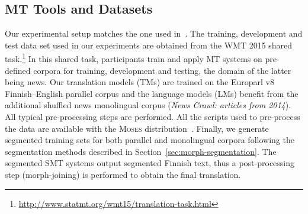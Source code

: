 \documentclass[free]{flammie}
\begin{document}

\subsection{MT Tools and Datasets}

Our experimental setup matches the one used in~\cite{rubino-EtAl:2015:WMT}. 
The training, development and test data set used in our experiments are obtained from the WMT 2015 shared task.\footnote{\url{http://www.statmt.org/wmt15/translation-task.html}}
In this shared task, participants train and apply MT systems on pre-defined corpora for training, development and testing, the domain of the latter being news.
Our translation models (TMs) are trained on the Europarl v8 Finnish--English parallel corpus and the language models (LMs) benefit from the additional shuffled news monolingual corpus (\textit{News Crawl: articles from 2014}).
All typical pre-processing steps are performed.
All the scripts used to pre-process the data are available with the \textsc{Moses} distribution~\cite{koehn2007moses}.
Finally, we generate segmented training sets for both parallel and monolingual corpora following the segmentation methods described in Section~\ref{sec:morph-segmentation}.
The segmented SMT systems output segmented Finnish text, thus a post-processing step (morph-joining) is performed to obtain the final translation.
\end{document}
